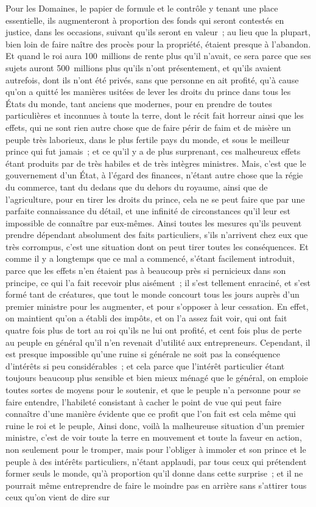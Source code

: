 \documentclass[french,twoside]{book} %
\begin{document}
Pour les Domaines, le papier de formule et le contrôle y tenant une place essentielle, ils augmenteront à proportion des fonds qui seront contestés en justice, dans les occasions, suivant qu’ils seront en valeur ; au lieu que la plupart, bien loin de faire naître des procès pour la propriété, étaient presque à l’abandon. Et quand le roi aura 100 millions de rente plus qu’il n’avait, ce sera parce que ses sujets auront 500 millions plus qu’ils n’ont présentement, et qu’ils avaient autrefois, dont ils n’ont été privés, sans que personne en ait profité, qu’à cause qu’on a quitté les manières usitées de lever les droits du prince dans tous les États du monde, tant anciens que modernes, pour en prendre de toutes particulières et inconnues à toute la terre, dont le récit fait horreur ainsi que les effets, qui ne sont rien autre chose que de faire périr de faim et de misère un peuple très laborieux, dans le plus fertile pays du monde, et sous le meilleur prince qui fut jamais ; et ce qu’il y a de plus surprenant, ces malheureux effets étant produits par de très habiles et de très intègres ministres. Mais, c’est que le gouvernement d’un État, à l’égard des finances, n’étant autre chose que la régie du commerce, tant du dedans que du dehors du royaume, ainsi que de l’agriculture, pour en tirer les droits du prince, cela ne se peut faire que par une parfaite connaissance du détail, et une infinité de circonstances qu’il leur est impossible de connaître par eux-mêmes. Ainsi toutes les mesures qu’ils peuvent prendre dépendant absolument des faits particuliers, s’ils n’arrivent chez eux que très corrompus, c’est une situation dont on peut tirer toutes les conséquences. Et comme il y a longtemps que ce mal a commencé, s’étant facilement introduit, parce que les effets n’en étaient pas à beaucoup près si pernicieux dans son principe, ce qui l’a fait recevoir plus aisément ; il s’est tellement enraciné, et s’est formé tant de créatures, que tout le monde concourt tous les jours auprès d’un premier ministre pour les augmenter, et pour s’opposer à leur cessation. En effet, on maintient qu’on a établi des impôts, et on l’a assez fait voir, qui ont fait quatre fois plus de tort au roi qu’ils ne lui ont profité, et cent fois plus de perte au peuple en général qu’il n’en revenait d’utilité aux entrepreneurs. Cependant, il est presque impossible qu’une ruine si générale ne soit pas la conséquence d’intérêts si peu considérables ; et cela parce que l’intérêt particulier étant toujours beaucoup plus sensible et bien mieux ménagé que le général, on emploie toutes sortes de moyens pour le soutenir, et que le peuple n’a personne pour se faire entendre, l’habileté consistant à cacher le point de vue qui peut faire connaître d’une manière évidente que ce profit que l’on fait est cela même qui ruine le roi et le peuple, Ainsi donc, voilà la malheureuse situation d’un premier ministre, c’est de voir toute la terre en mouvement et toute la faveur en action, non seulement pour le tromper, mais pour l’obliger à immoler et son prince et le peuple à des intérêts particuliers, n’étant applaudi, par tous ceux qui prétendent former seuls le monde, qu’à proportion qu’il donne dans cette surprise ; et il ne pourrait même entreprendre de faire le moindre pas en arrière sans s’attirer tous ceux qu’on vient de dire sur 
\end{document}
